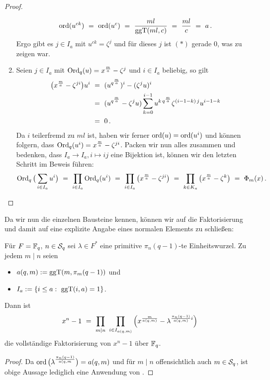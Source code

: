 \begin{proof}
\begin{enumerate}
    \[ \ord(u^{ck}) \speq= \ord(u^c) \speq= \frac{ml}{\ggT(ml,c)}
      \speq= \frac{ml}{c} \speq= a\,.\]
    Ergo gibt es $j\in I_a$ mit $u^{ck} = \zeta^j$ und für dieses $j$ ist
    $(\ast)$ gerade $0$, was zu zeigen war.
  \item Seien $j\in I_a$ mit $\Ord_q(u) = x^\frac m a - \zeta^j$ und 
    $i\in I_a$ beliebig, so gilt
    \begin{align*}
      \big( x^\frac m a - \zeta^{ji} \big) u^i \speq{&=}
      (u^{q^\frac m a})^i - (\zeta^ju)^i \\
      \speq{&=} (u^{q^\frac m a} - \zeta^ju) 
        \sum_{k=0}^{i-1} u^{k\,q^\frac m a} \zeta^{(i-1-k)\,j}u^{i-1-k} \\
        \speq{&=} 0\,.
    \end{align*}
    Da $i$ teilerfremd zu $ml$ ist, haben wir ferner $\ord(u) = \ord(u^i)$ und
    können folgern, dass $\Ord_q(u^i) = x^\frac m a - \zeta^{ji}$.
    Packen wir nun alles zusammen und bedenken, dass
    $I_a \to I_a, i\mapsto ij$ eine Bijektion ist, können wir den letzten
    Schritt im Beweis führen:
    \[ \Ord_q\big( \sum_{i\in I_a} u^i \big)
      \speq= \prod_{i\in I_a} \Ord_q(u^i) \speq=
      \prod_{i \in I_a} \big( x^\frac m a - \zeta^{ji} \big)
      \speq= \prod_{k\in K_a} \big(x^\frac m a - \zeta^k \big)
      \speq= \Phi_m(x)\,.\]
  \end{enumerate}
\end{proof}

Da wir nun die einzelnen Bausteine kennen, können wir auf die Faktorisierung
und damit auf eine explizite Angabe eines normalen Elements zu schließen:

\begin{kor}
  \label{kor:konstruktion-q-ordnung}
  Für $F = \F_q$, $n\in \S_q$ sei $\lambda \in F^\ast$ eine primitive 
  $\pi_n(q-1)$-te Einheitswurzel. Zu jedem $m \mid n$ seien
  \begin{itemize}
    \item $a(q,m) := \ggT(m,\pi_m(q-1))$ und
    \item $I_a := \{ i\leq a:\ \ggT(i,a) = 1\}$.
  \end{itemize}
  Dann ist
  \[ x^n-1 \speq= \prod_{m\mid n}\ \prod_{i\in I_{a(q,m)}} 
    \left( x^\frac{m}{a(q,m)} - \lambda^{\frac{\pi_n(q-1)}{a(q,m)} i}\right)\]
  die vollständige Faktorisierung von $x^n-1$ über $\F_q$.
\end{kor}
\begin{proof}
  Da  $\ord\big(\lambda^{\frac{\pi_n(q-1)}{a(q,m}}\big) = a(q,m)$
  und für $m\mid n$ offensichtlich auch $m\in \S_q$, ist obige Aussage lediglich
  eine Anwendung von .
\end{proof}

